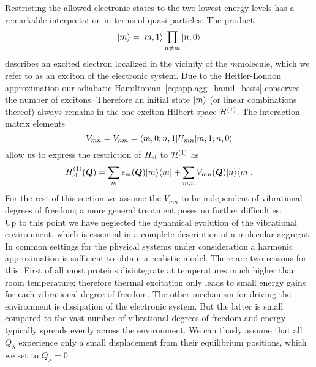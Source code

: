 Restricting the allowed electronic states to the two lowest energy levels has a remarkable interpretation in terms of quasi-particles:
The product
\begin{equation}
  | m \rangle = | m, 1 \rangle \prod_{n \neq m} | n, 0 \rangle
  \label{eq:app.exciton_state}
\end{equation}
describes an excited electron localized in the vicinity of the $m$\th molecule, which we refer to as an exciton of the electronic system.
Due to the Heitler-London approximation our adiabatic Hamiltonian~\ref{eq:app.agg_hamil_basis} conserves the number of excitons.
Therefore an initial state $| m \rangle$ (or linear combinations thereof) always remains in the one-exciton Hilbert space $\mathcal{H}^{(1)}$.
The interaction matrix elements
\begin{equation*}
  V_{mn} = V_{nm} = \langle m, 0; n, 1 | U_{mn} | m, 1; n, 0 \rangle
\end{equation*}
allow us to express the restriction of $H_\mathrm{el}$ to $\mathcal{H}^{(1)}$ as
\begin{equation*}
  H_\mathrm{el}^{(1)}(\boldsymbol{Q}) = \sum_m \epsilon_m(\boldsymbol{Q}) | m \rangle\langle m | + \sum_{m,n} V_{mn}(\boldsymbol{Q}) | n \rangle\langle m |.
\end{equation*}
For the rest of this section we assume the $V_{mn}$ to be independent of vibrational degrees of freedom; a more general treatment poses no further difficulties.\\


Up to this point we have neglected the dynamical evolution of the vibrational environment, which is essential in a complete description of a molecular aggregat.
In common settings for the physical systems under consideration a harmonic approximation is sufficient to obtain a realistic model.
There are two reasons for this:
First of all most proteins disintegrate at temperatures much higher than room temperature; therefore thermal excitation only leads to small energy gains for each vibrational degree of freedom.
The other mechanism for driving the environment is dissipation of the electronic system.
But the latter is small compared to the vast number of vibrational degrees of freedom and energy typically spreads evenly across the environment.
We can thusly assume that all $Q_\lambda$ experience only a small displacement from their equilibrium positions, which we set to $Q_\lambda = 0$.

